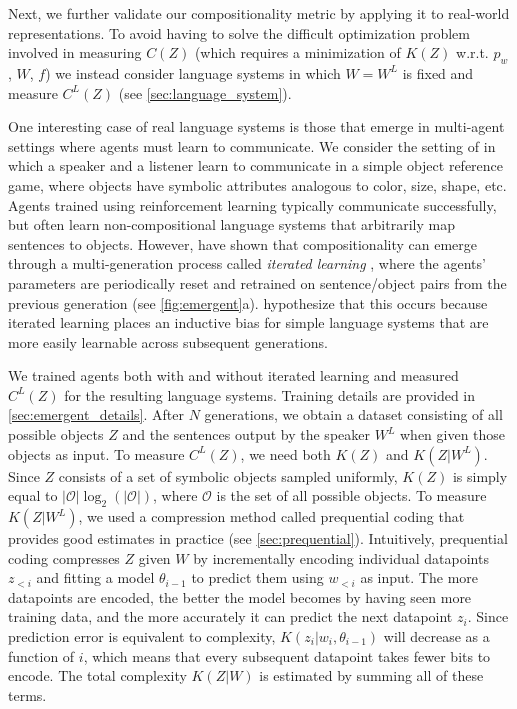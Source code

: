 \documentclass{article} %
\begin{document}
Next, we further validate our compositionality metric by applying it to real-world representations. To avoid having to solve the difficult optimization problem involved in measuring $C(Z)$ (which requires a minimization of $K(Z)$ w.r.t. $p_w$, $W$, $f$) we instead consider language systems in which $W = W^L$ is fixed and measure $C^L(Z)$ (see \cref{sec:language_system}).

One interesting case of real language systems is those that emerge in multi-agent settings where agents must learn to communicate. We consider the setting of \citet{li2019ease,ren2020compositional} in which a speaker and a listener learn to communicate in a simple object reference game, where objects have symbolic attributes analogous to color, size, shape, etc. Agents trained using reinforcement learning typically communicate successfully, but often learn non-compositional language systems that arbitrarily map sentences to objects. However, \citet{li2019ease,ren2020compositional} have shown that compositionality can emerge through a multi-generation process called \textit{iterated learning} \citep{kirby2015compression}, where the agents' parameters are periodically reset and retrained on sentence/object pairs from the previous generation (see \cref{fig:emergent}a). \citet{kirby2015compression} hypothesize that this occurs because iterated learning places an inductive bias for simple language systems that are more easily learnable across subsequent generations.

We trained agents both with and without iterated learning and measured $C^L(Z)$ for the resulting language systems. Training details are provided in \cref{sec:emergent_details}. After $N$ generations, we obtain a dataset consisting of all possible objects $Z$ and the sentences output by the speaker $W^L$ when given those objects as input. To measure $C^L(Z)$, we need both $K(Z)$ and $K(Z|W^L)$. Since $Z$ consists of a set of symbolic objects sampled uniformly, $K(Z)$ is simply equal to $|\mathcal{O}|\log_2(|\mathcal{O}|)$, where $\mathcal{O}$ is the set of all possible objects. To measure $K(Z|W^L)$, we used a compression method called prequential coding \citep{blier2018description} that provides good estimates in practice (see \cref{sec:prequential}). Intuitively, prequential coding compresses $Z$ given $W$ by incrementally encoding individual datapoints $z_{<i}$ and fitting a model $\theta_{i-1}$ to predict them using $w_{<i}$ as input. The more datapoints are encoded, the better the model becomes by having seen more training data, and the more accurately it can predict the next datapoint $z_i$. Since prediction error is equivalent to complexity, $K(z_i|w_i, \theta_{i-1})$ will decrease as a function of $i$, which means that every subsequent datapoint takes fewer bits to encode. The total complexity $K(Z|W)$ is estimated by summing all of these terms.
\end{document}
